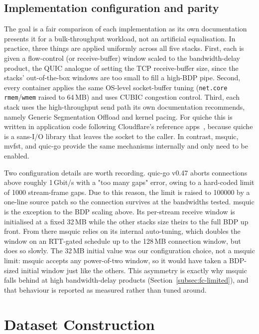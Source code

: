 \subsection{Implementation configuration and parity}
\label{subsec:config-parity}

The goal is a fair comparison of each implementation as its own documentation
presents it for a bulk-throughput workload, not an artificial equalisation. In
practice, three things are applied uniformly across all five stacks. First,
each is given a flow-control (or receive-buffer) window scaled to the
bandwidth-delay product, the QUIC analogue of setting the TCP receive-buffer
size, since the stacks' out-of-the-box windows are too small to fill a
high-BDP pipe.
Second, every container applies the same OS-level socket-buffer tuning
(\texttt{net.core} \texttt{rmem}/\texttt{wmem} raised to 64\,MB) and uses CUBIC
congestion control. Third, each stack uses the high-throughput send path its
own documentation recommends, namely Generic Segmentation Offload and kernel
pacing. For quiche this is written in application code following Cloudflare's
reference apps~\cite{cloudflare-quiche-gso}, because quiche is a sans-I/O
library that leaves the socket to the caller. In contrast, msquic, mvfst, and
quic-go provide the same mechanisms internally and only need to be enabled.

Two configuration details are worth recording. quic-go v0.47 aborts connections
above roughly 1\,Gbit/s with a "too many gaps" error, owing to a hard-coded
limit of 1000 stream-frame gaps. Due to this reason, the limit is raised to 100000
by a one-line source patch so the connection survives at the bandwidths tested.
msquic is the exception to the BDP scaling above. Its per-stream receive window
is initialised at a fixed 32\,MB while the other stacks size theirs to the full
BDP up front. From there msquic relies on its internal auto-tuning, which doubles
the window on an RTT-gated schedule up to the 128\,MB connection window, but does
so slowly. The 32\,MB initial value was our configuration choice, not a msquic
limit: msquic accepts any power-of-two window, so it would have taken a
BDP-sized initial window just like the others. This asymmetry is exactly why
msquic falls behind at high bandwidth-delay products
(Section~\ref{subsec:fc-limited}), and that behaviour is reported as measured
rather than tuned around.

\section{Dataset Construction}
\label{sec:dataset}

